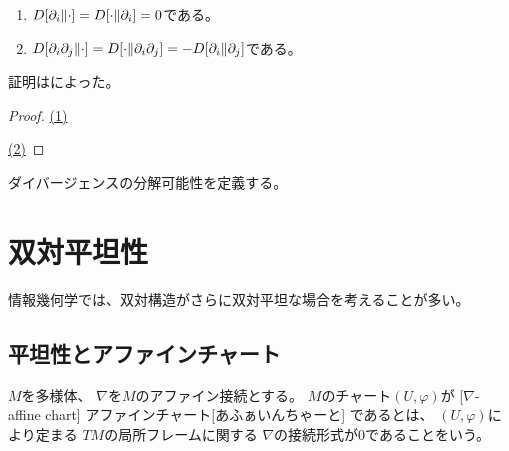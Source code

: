 \documentclass[report]{jlreq}
\begin{document}
\begin{proposition}
    \begin{enumerate}
        \item $D[\partial_i \| \cdot] = D[\cdot \| \partial_i] = 0$である。
        \item $D[\partial_i \partial_j \| \cdot]
            = D[\cdot \| \partial_i \partial_j]
            = - D[\partial_i \| \partial_j]$である。
    \end{enumerate}
\end{proposition}

証明は\cite{eguchi_geometry_1992}によった。

\begin{proof}
    \uline{(1)} \quad
    \TODO{}

    \uline{(2)} \quad
    \TODO{}
\end{proof}

\begin{definition}[ダイバージェンスから誘導される双対構造]
    \TODO{}
\end{definition}

ダイバージェンスの分解可能性を定義する。

\begin{definition}[ダイバージェンスの分解可能性]
    \TODO{}
\end{definition}




%
\chapter{双対平坦性}

情報幾何学では、双対構造がさらに双対平坦な場合を考えることが多い。

%
\section{平坦性とアファインチャート}


\begin{definition}
    $M$を多様体、
    $\nabla$を$M$のアファイン接続とする。
    $M$のチャート$(U, \varphi)$が
    [$\nabla$-affine chart]
        {アファインチャート}[あふぁいんちゃーと]
    であるとは、
    $(U, \varphi)$により定まる
    $TM$の局所フレームに関する
    $\nabla$の接続形式が$0$であることをいう。
\end{definition}
\end{document}
